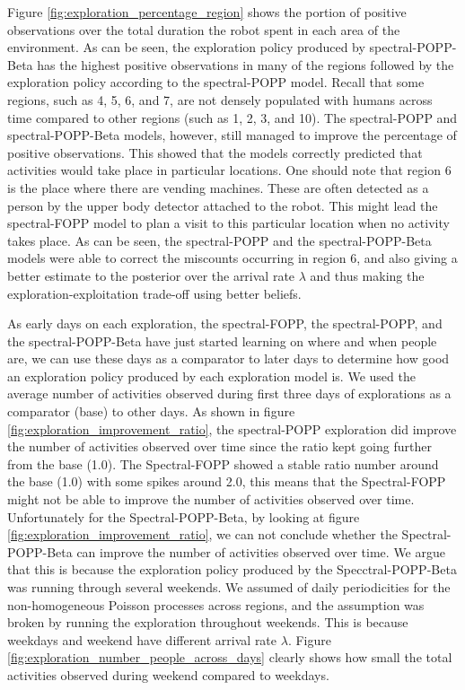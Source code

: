 Figure \ref{fig:exploration_percentage_region} shows the portion of positive observations over the total duration the robot spent in each area of the environment. As can be seen, the exploration policy produced by spectral-POPP-Beta has the highest positive observations in many of the regions followed by the exploration policy according to the spectral-POPP model. Recall that some regions, such as 4, 5, 6, and 7, are not densely populated with humans across time compared to other regions (such as 1, 2, 3, and 10). The spectral-POPP and spectral-POPP-Beta models, however, still managed to improve the percentage of positive observations. This showed that the models correctly predicted that activities would take place in particular locations. One should note that region 6 is the place where there are vending machines. These are often detected as a person by the upper body detector attached to the robot. This might lead the spectral-FOPP model to plan a visit to this particular location when no activity takes place. As can be seen, the spectral-POPP and the spectral-POPP-Beta models were able to correct the miscounts occurring in region 6, and also giving a better estimate to the posterior over the arrival rate $\lambda$ and thus making the exploration-exploitation trade-off using better beliefs.

As early days on each exploration, the spectral-FOPP, the spectral-POPP, and the spectral-POPP-Beta have just started learning on where and when people are, we can use these days as a comparator to later days to determine how good an exploration policy produced by each exploration model is. We used the average number of activities observed during first three days of explorations as a comparator (base) to other days. As shown in figure \ref{fig:exploration_improvement_ratio}, the spectral-POPP exploration did improve the number of activities observed over time since the ratio kept going further from the base (1.0). The Spectral-FOPP showed a stable ratio number around the base (1.0) with some spikes around 2.0, this means that the Spectral-FOPP might not be able to improve the number of activities observed over time. Unfortunately for the Spectral-POPP-Beta, by looking at figure \ref{fig:exploration_improvement_ratio}, we can not conclude whether the Spectral-POPP-Beta can improve the number of activities observed over time.
We argue that this is because the exploration policy produced by the Specctral-POPP-Beta was running through several weekends. We assumed of daily periodicities for the non-homogeneous Poisson processes across regions, and the assumption was broken by running the exploration throughout weekends. This is because weekdays and weekend have different arrival rate $\lambda$. Figure \ref{fig:exploration_number_people_across_days} clearly shows how small the total activities observed during weekend compared to weekdays.